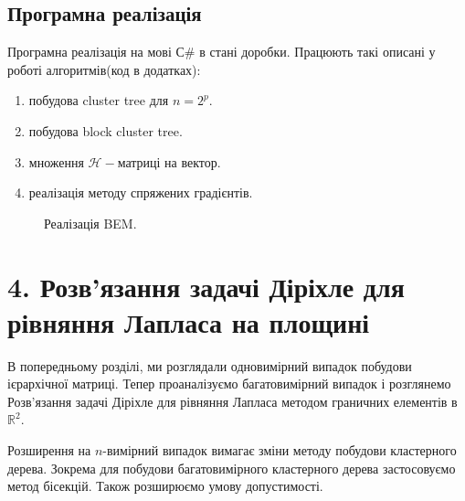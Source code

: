 \documentclass[12pt]{report}
\begin{document}
	\section{Програмна реалізація}
	\hspace{0.8cm} Програмна реалізація на мові $С\#$ в стані доробки. Працюють такі описані у роботі алгоритмів(код в додатках):
		 \begin{enumerate}
		 	\item побудова cluster tree для $n=2^p$.
		 	\item побудова block cluster tree.
		 	\item множення $\mathcal{H}-$матриці на вектор.
		 	\item реалізація методу спряжених градієнтів.
		 \end{enumerate}
	\begin{figure}[bh]
			\caption{Реалізація BEM.}	 
			\end{figure}
	\chapter{4. Розв'язання задачі Діріхле для рівняння Лапласа на площині}
	\hspace{0.8cm} В попередньому розділі, ми розглядали одновимірний випадок побудови ієрархічної матриці. Тепер проаналізуємо багатовимірний випадок і розглянемо Розв'язання задачі Діріхле для рівняння Лапласа методом граничних елементів в $\mathbb{R}^2$. 
	\par Розширення на $n$-вимірний випадок вимагає зміни методу побудови кластерного дерева. Зокрема для побудови багатовимірного кластерного дерева застосовуємо метод бісекцій. Також розширюємо умову допустимості.
\end{document}

